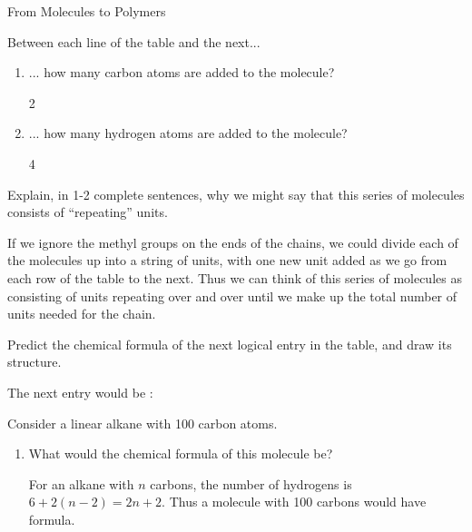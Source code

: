 \begin{activity}{From Molecules to Polymers}
\begin{ctqs}
	\question Between each line of the table and the next...
		\begin{enumerate}
			\item ... how many carbon atoms are added to the molecule?
			
				\begin{solution}[0.25in]
				2
				\end{solution}
				
			\item ... how many hydrogen atoms are added to the molecule?
			
				\begin{solution}[0.25in]
				4
				\end{solution}
				
		\end{enumerate}
		
	\question Explain, in 1-2 complete sentences, why we might say that this series of molecules consists of ``repeating''  units.
			
				\begin{solution}[1.5in]
					If we ignore the methyl groups on the ends of the chains, we could divide each of the molecules up into a string of  units, with one new unit added as we go from each row of the table to the next.  Thus we can think of this series of molecules as consisting of  units repeating over and over until we make up the total number of units needed for the chain.
				\end{solution}
				
		
	\question Predict the chemical formula of the next logical entry in the table, and draw its structure.
			
				\begin{solution}[1in]
					The next entry would be :
					
				\end{solution}
		
	\question Consider a linear alkane with 100 carbon atoms. \label{\labelbase:ctq:100Calkane}
		\begin{enumerate}
			
			\item What would the chemical formula of this molecule be?
			
				\begin{solution}[1in]
					For an alkane with $n$ carbons, the number of hydrogens is $6+2(n-2) = 2n+2$.  Thus a molecule with 100 carbons would have formula.
				\end{solution}
			

\end{enumerate}
\end{ctqs}
\end{activity}
